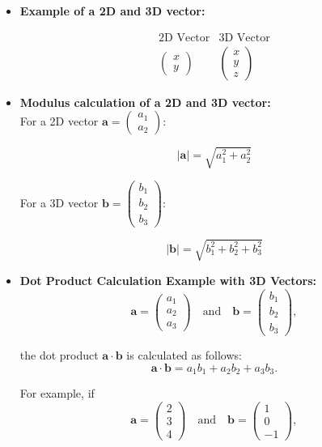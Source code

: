 \documentclass[a4paper,12pt]{article}
\begin{document}
\begin{itemize}[leftmargin=*]
\item \textbf{Example of a 2D and 3D vector:}

\[
\begin{array}{cc}
\text{2D Vector} & \text{3D Vector} \\
\begin{pmatrix}
x \\
y
\end{pmatrix}
&
\begin{pmatrix}
x \\
y \\
z
\end{pmatrix}
\end{array}
\]

\item \textbf{Modulus calculation of a 2D and 3D vector:}\\

For a 2D vector \(\mathbf{a} = \begin{pmatrix} a_1 \\ a_2 \end{pmatrix}\):

\[
|\mathbf{a}| = \sqrt{a_1^2 + a_2^2}
\]

For a 3D vector \(\mathbf{b} = \begin{pmatrix} b_1 \\ b_2 \\ b_3 \end{pmatrix}\):

\[
|\mathbf{b}| = \sqrt{b_1^2 + b_2^2 + b_3^2}
\]

\item \textbf{Dot Product Calculation Example with 3D Vectors:}
\[
\mathbf{a} = \begin{pmatrix} a_1 \\ a_2 \\ a_3 \end{pmatrix}
\quad \text{and} \quad
\mathbf{b} = \begin{pmatrix} b_1 \\ b_2 \\ b_3 \end{pmatrix},
\]

the dot product \(\mathbf{a} \cdot \mathbf{b}\) is calculated as follows:
\[
\mathbf{a} \cdot \mathbf{b} = a_1 b_1 + a_2 b_2 + a_3 b_3.
\]

For example, if
\[
\mathbf{a} = \begin{pmatrix} 2 \\ 3 \\ 4 \end{pmatrix}
\quad \text{and} \quad
\mathbf{b} = \begin{pmatrix} 1 \\ 0 \\ -1 \end{pmatrix},
\]


\end{itemize}
\end{document}
